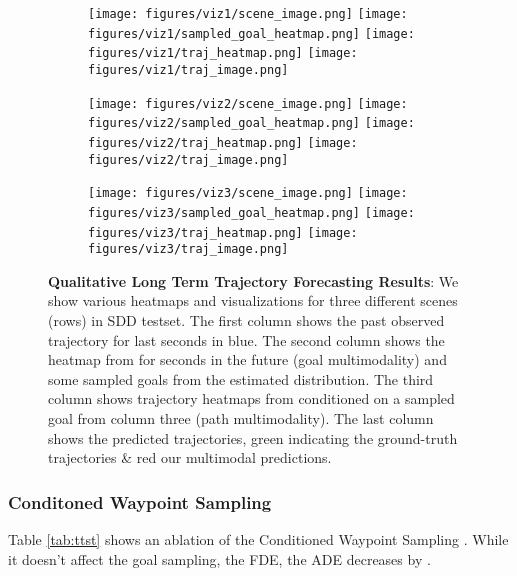 \documentclass[final]{cvpr}
\begin{document}
\begin{figure*}[t!]
\centering
\begin{subfigure}{\textwidth}
    \centering
    \texttt{[image: figures/viz1/scene\_image.png]}
    \texttt{[image: figures/viz1/sampled\_goal\_heatmap.png]}
    \texttt{[image: figures/viz1/traj\_heatmap.png]}
    \texttt{[image: figures/viz1/traj\_image.png]}
\end{subfigure}
\begin{subfigure}{\textwidth}
    \centering
    \texttt{[image: figures/viz2/scene\_image.png]}
    \texttt{[image: figures/viz2/sampled\_goal\_heatmap.png]}
    \texttt{[image: figures/viz2/traj\_heatmap.png]}
    \texttt{[image: figures/viz2/traj\_image.png]}
\end{subfigure}
\begin{subfigure}{\textwidth}
    \centering
    \texttt{[image: figures/viz3/scene\_image.png]}
    \texttt{[image: figures/viz3/sampled\_goal\_heatmap.png]}
    \texttt{[image: figures/viz3/traj\_heatmap.png]}
    \texttt{[image: figures/viz3/traj\_image.png]}
\end{subfigure}

\caption[short]{\textbf{Qualitative Long Term Trajectory Forecasting Results}: We show various heatmaps and visualizations for three different scenes (rows) in SDD testset. The first column shows the past observed trajectory for last  seconds in blue. The second column shows the heatmap from  for  seconds in the future (goal multimodality) and some sampled goals from the estimated distribution. The third column shows trajectory heatmaps from  conditioned on a sampled goal from column three (path multimodality). The last column shows the predicted trajectories, green indicating the ground-truth trajectories \& red our multimodal predictions.}
\label{fig:qual}
\end{figure*}

\subsubsection{Conditoned Waypoint Sampling}
Table \ref{tab:ttst} shows an ablation of the Conditioned Waypoint Sampling . While it doesn't affect the goal sampling, \ie the FDE, the ADE decreases by .
\end{document}
